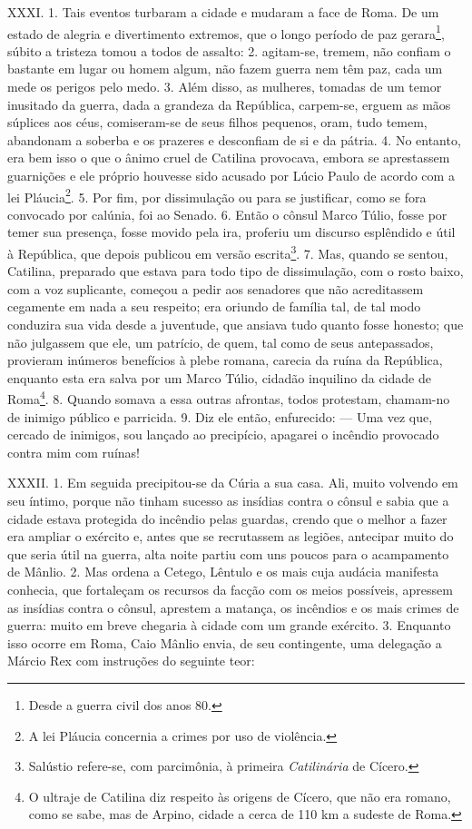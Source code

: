 XXXI. 1. Tais eventos turbaram a cidade e mudaram a face de Roma. De um estado
de alegria e divertimento extremos, que o longo período de paz
gerara\footnote{Desde a guerra civil dos anos 80.}, súbito a tristeza tomou a
todos de assalto: 2. agitam-se, tremem, não confiam o bastante em lugar ou
homem algum, não fazem guerra nem têm paz, cada um mede os perigos pelo medo.
3. Além disso, as mulheres, tomadas de um temor inusitado da guerra, dada a
grandeza da República, carpem-se, erguem as mãos súplices aos céus,
comiseram-se de seus filhos pequenos, oram, tudo temem, abandonam a soberba e
os prazeres e desconfiam de si e da pátria. 4. No entanto, era bem isso o que o
ânimo cruel de Catilina provocava, embora se aprestassem guarnições e ele
próprio houvesse sido acusado por Lúcio Paulo de acordo com a lei
Pláucia\footnote{A lei Pláucia concernia a crimes por uso de violência.}. 5.
Por fim, por dissimulação ou para se justificar, como se fora convocado por
calúnia, foi ao Senado. 6. Então o cônsul Marco Túlio, fosse por temer sua
presença, fosse movido pela ira, proferiu um discurso esplêndido e útil à
República, que depois publicou em versão escrita\footnote{Salústio refere-se,
com parcimônia, à primeira \emph{Catilinária} de Cícero.}. 7. Mas, quando se
sentou, Catilina, preparado que estava para todo tipo de dissimulação, com o
rosto baixo, com a voz suplicante, começou a pedir aos senadores que não
acreditassem cegamente em nada a seu respeito; era oriundo de família tal, de
tal modo conduzira sua vida desde a juventude, que ansiava tudo quanto fosse
honesto; que não julgassem que ele, um patrício, de quem, tal como de seus
antepassados, provieram inúmeros benefícios à plebe romana, carecia da ruína da
República, enquanto esta era salva por um Marco Túlio, cidadão inquilino da
cidade de Roma\footnote{O ultraje de Catilina diz respeito às origens de
Cícero, que não era romano, como se sabe, mas de Arpino, cidade a cerca de 110
km a sudeste de Roma.}. 8. Quando somava a essa outras afrontas, todos
protestam, chamam-no de inimigo público e parricida. 9. Diz ele então,
enfurecido: --- Uma vez que, cercado de inimigos, sou lançado ao precipício,
apagarei o incêndio provocado contra mim com ruínas!

XXXII. 1. Em seguida precipitou-se da Cúria a sua casa. Ali, muito volvendo em
seu íntimo, porque não tinham sucesso as insídias contra o cônsul e sabia que a
cidade estava protegida do incêndio pelas guardas, crendo que o melhor a fazer
era ampliar o exército e, antes que se recrutassem as legiões, antecipar muito
do que seria útil na guerra, alta noite partiu com uns poucos para o
acampamento de Mânlio. 2. Mas ordena a Cetego, Lêntulo e os mais cuja audácia
manifesta conhecia, que fortaleçam os recursos da facção com os meios
possíveis, apressem as insídias contra o cônsul, aprestem a matança, os
incêndios e os mais crimes de guerra: muito em breve chegaria à cidade com um
grande exército. 3. Enquanto isso ocorre em Roma, Caio Mânlio envia, de seu contingente, uma delegação  a Márcio
Rex com instruções do seguinte teor:

